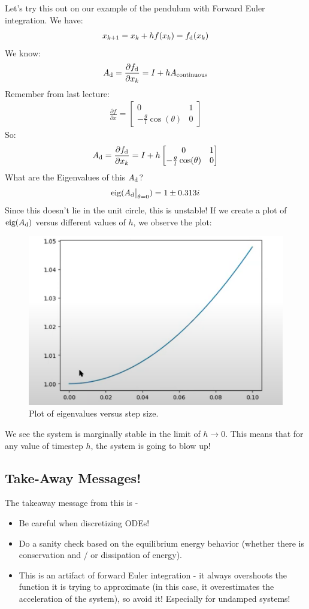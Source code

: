 \noindent
Let's try this out on our example of the pendulum with Forward Euler integration. 
We have: 
\begin{align}
    x_{k+1} = x_{k} + h f(x_k) = f_{\rm d} (x_k)
\end{align}
We know: 
\begin{align}
    A_{\rm d} = \frac{\partial f_{\rm d}}{\partial x_k} = I + h A_{\rm continuous}
\end{align}
Remember from last lecture: 
\begin{align}
    \frac{\partial f}{\partial x} = \begin{bmatrix}
        0 & 1 \\
        - \frac{g}{l} \cos(\theta) & 0
    \end{bmatrix}
\end{align}
So: 
\begin{align}
    A_{\rm d} = \frac{\partial f_{\rm d}}{\partial x_k} = I + h \begin{bmatrix}
        0 & 1 \\
        - \frac{g}{l} \cos(\theta) & 0
    \end{bmatrix}
\end{align}
What are the Eigenvalues of this $A_{\rm d}$? 
\begin{align}
    \textrm{eig} ( \evalat{A_{\rm d}}{\theta=0} ) = 1 \pm 0.313 i
\end{align}
Since this doesn't lie in the unit circle, this is unstable! 
If we create a plot of $\textrm{eig}(A_{\rm d})$ versus different values of $h$, we observe the plot: 
\begin{figure}
    \centering
    \includegraphics[width=0.4\linewidth]{L2_Images/L2_plot.PNG}
    \caption{Plot of eigenvalues versus step size.}
    \label{fig:l2f1}
\end{figure}
We see the system is marginally stable in the limit of $h \rightarrow 0$. This means that for any value of timestep $h$, the system is going to blow up!

\subsection{Take-Away Messages!}
The takeaway message from this is - 
\begin{itemize}
    \item Be careful when discretizing ODEs!
    \item Do a sanity check based on the equilibrium energy behavior (whether there is conservation and / or dissipation of energy). 
    \item This is an artifact of forward Euler integration - it always overshoots the function it is trying to approximate (in this case, it overestimates the acceleration of the system), so avoid it!
    Especially for undamped systems! 
\end{itemize}

